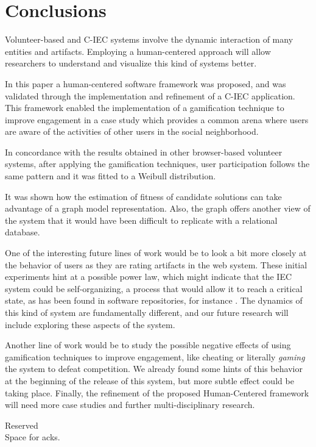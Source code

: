 \section{Conclusions}
\label{sec:conclusions}

Volunteer-based and C-IEC systems involve the dynamic 
interaction of many entities and artifacts. Employing a human-centered approach 
will allow researchers to understand and visualize this kind of
systems better. %

In this paper a human-centered software framework was proposed, and was validated
through the implementation and refinement of a C-IEC application.
This framework enabled the implementation of a gamification technique 
to improve engagement in a case study which provides a common arena where users are aware of the
activities of other users in the social neighborhood. 

In concordance with the results obtained in other 
browser-based volunteer systems, after 
applying the gamification techniques, user participation follows the
same pattern and it was fitted to a Weibull distribution. 

It was shown how the estimation of fitness of candidate solutions
can take advantage of a graph model representation. Also, the graph
offers another view of the system that it would have been
difficult to replicate with a relational database. 

One of the interesting future lines of work would be to look a bit
more closely at the behavior of users as they are rating artifacts 
in the web system. These initial experiments hint at a possible power law, which might indicate that
the IEC system could be self-organizing, a process that would allow it
to reach a critical state, as has been found in software repositories,
for instance \cite{Merelo2016:repomining}. 
The dynamics of this kind of system are fundamentally different, and our future research will
include exploring these aspects of the system. 

Another line of work would be to study the possible negative effects of using  
gamification techniques to improve engagement, like cheating or
literally {\em gaming} the system to defeat competition. We already
found some hints of this behavior at the beginning of the release of
this system, but more subtle effect could be taking place. 
Finally, the refinement of the proposed Human-Centered framework will need
more case studies and further multi-disciplinary research. 

\begin{acks}
  Reserved\\
  Space for acks. 



\end{acks}
